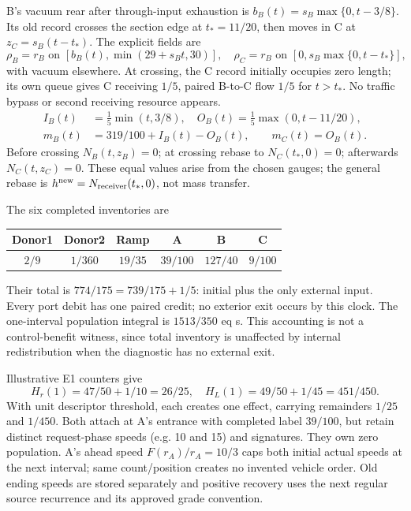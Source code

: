 \documentclass[11pt,a4paper]{article}
\begin{document}
B's vacuum rear after through-input exhaustion is
$b_B(t)=s_B\max\{0,t-3/8\}$. Its old record crosses the section edge at
$t_*=11/20$, then moves in C at $z_C=s_B(t-t_*)$. The explicit fields are
\begin{equation}
 \rho_B=r_B\text{ on }[b_B(t),\min(29+s_Bt,30)],\quad
 \rho_C=r_B\text{ on }[0,s_B\max\{0,t-t_*\}],
\end{equation}
with vacuum elsewhere. At crossing, the C record initially occupies zero
length; its own queue gives C receiving $1/5$, paired B-to-C flow $1/5$ for
$t>t_*$. No traffic bypass or second receiving resource appears.
\begin{align}
 I_B(t)&=\tfrac15\min(t,3/8),\quad O_B(t)=\tfrac15\max(0,t-11/20),\\
 m_B(t)&=319/100+I_B(t)-O_B(t),\qquad m_C(t)=O_B(t).
\end{align}
Before crossing $N_B(t,z_B)=0$; at crossing rebase to $N_C(t_*,0)=0$;
afterwards $N_C(t,z_C)=0$. These equal values arise from the chosen gauges;
the general rebase is $h^{\rm new}=N_{\rm receiver}(t_*,0)$, not mass transfer.

The six completed inventories are
\begin{center}\begin{tabular}{cccccc}\toprule
Donor1&Donor2&Ramp&A&B&C\\\midrule
$2/9$&$1/360$&$19/35$&$39/100$&$127/40$&$9/100$\\\bottomrule
\end{tabular}\end{center}
Their total is $774/175=739/175+1/5$: initial plus the only external input.
Every port debit has one paired credit; no exterior exit occurs by this clock.
The one-interval population integral is $1513/350$ eq s. This accounting is
not a control-benefit witness, since total inventory is unaffected by internal
redistribution when the diagnostic has no external exit.

Illustrative E1 counters give
\begin{equation}
 H_r(1)=47/50+1/10=26/25,\quad H_L(1)=49/50+1/45=451/450.
\end{equation}
With unit descriptor threshold, each creates one effect, carrying remainders
$1/25$ and $1/450$. Both attach at A's entrance with completed label $39/100$,
but retain distinct request-phase speeds (e.g. 10 and 15) and signatures.
They own zero population. A's ahead speed $F(r_A)/r_A=10/3$ caps both initial
actual speeds at the next interval; same count/position creates no invented
vehicle order. Old ending speeds are stored separately and positive recovery
uses the next regular source recurrence and its approved grade convention.
\end{document}
